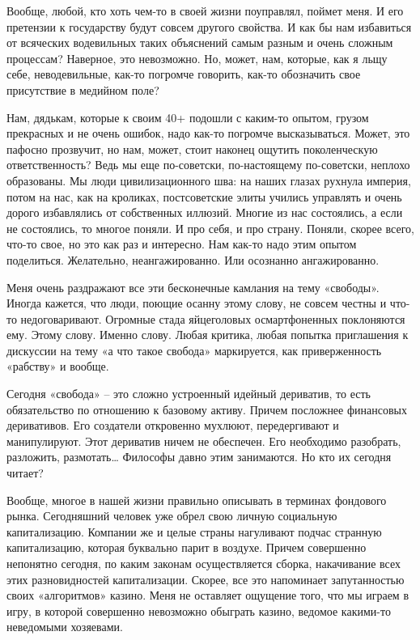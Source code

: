 Вообще, любой, кто хоть чем-то в своей жизни поуправлял, поймет меня. И его
претензии к государству будут совсем другого свойства. И как бы нам избавиться
от всяческих водевильных таких объяснений самым разным и очень сложным
процессам? Наверное, это невозможно. Но, может, нам, которые, как я льщу себе,
неводевильные, как-то погромче говорить, как-то обозначить свое присутствие в
медийном поле?

Нам, дядькам, которые к своим 40+ подошли с каким-то опытом, грузом прекрасных
и не очень ошибок, надо как-то погромче высказываться. Может, это пафосно
прозвучит, но нам, может, стоит наконец ощутить поколенческую ответственность?
Ведь мы еще по-советски, по-настоящему по-советски, неплохо образованы. Мы люди
цивилизационного шва: на наших глазах рухнула империя, потом на нас, как на
кроликах, постсоветские элиты учились управлять и очень дорого избавлялись от
собственных иллюзий. Многие из нас состоялись, а если не состоялись, то многое
поняли. И про себя, и про страну. Поняли, скорее всего, что-то свое, но это как
раз и интересно. Нам как-то надо этим опытом поделиться. Желательно,
неангажированно. Или осознанно ангажированно.

Меня очень раздражают все эти бесконечные камлания на тему «свободы». Иногда
кажется, что люди, поющие осанну этому слову, не совсем честны и что-то
недоговаривают. Огромные стада яйцеголовых осмартфоненных поклоняются ему.
Этому слову. Именно слову. Любая критика, любая попытка приглашения к дискуссии
на тему «а что такое свобода» маркируется, как приверженность «рабству» и
вообще.

Сегодня «свобода» – это сложно устроенный идейный дериватив, то есть
обязательство по отношению к базовому активу. Причем посложнее финансовых
деривативов. Его создатели откровенно мухлюют, передергивают и манипулируют.
Этот дериватив ничем не обеспечен. Его необходимо разобрать, разложить,
размотать… Философы давно этим занимаются. Но кто их сегодня читает? 

Вообще, многое в нашей жизни правильно описывать в терминах фондового рынка.
Сегодняшний человек уже обрел свою личную социальную капитализацию. Компании же
и целые страны нагуливают подчас странную капитализацию, которая буквально
парит в воздухе. Причем совершенно непонятно сегодня, по каким законам
осуществляется сборка, накачивание всех этих разновидностей капитализации.
Скорее, все это напоминает запутанностью своих «алгоритмов» казино. Меня не
оставляет ощущение того, что мы играем в игру, в которой совершенно невозможно
обыграть казино, ведомое какими-то неведомыми хозяевами.


